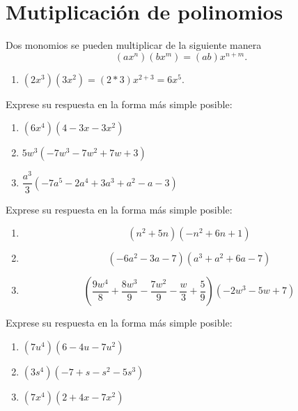 
\section{Mutiplicaci\'on de polinomios}


	Dos monomios se pueden multiplicar de la siguiente manera
	$$
	(ax^{n})(bx^{m})=(ab)x^{n+m}.
	$$



	\begin{problema}
		\begin{enumerate}
			\item $\left( 2x^{3} \right)\left( 3x^{2} \right)=\left( 2*3 \right)x^{2+3}=6x^{5}.$
		\end{enumerate}
		
	\end{problema}
	



	\begin{problema}
		Exprese su respuesta en la forma más simple posible:
		\begin{enumerate}
			\item $(6x^{4})(4-3x-3x^{2})$
			\item $5w^{3}\left( -7w^{3}-7w^{2}+7w+3 \right)$
			\item $\dfrac{a^{3}}{3}\left( -7a^{5}-2a^{4}+3a^{3}+a^{2}-a-3 \right)$
		\end{enumerate}
		
	\end{problema}
	



	\begin{problema}
		Exprese su respuesta en la forma más simple posible:
		\begin{enumerate}
			\item $$
			\left( n^{2}+5n \right)
			\left( -n^{2}+6n+1 \right)
			$$
			
			\item $$
			\left( -6a^{2}-3a-7 \right)
			\left( a^{3}+a^{2}+6a-7 \right)
			$$
			
			\item $$
			\left( \dfrac{9w^{4}}{8}+\dfrac{8w^{3}}{9}-\dfrac{7w^{2}}{9}-\dfrac{w}{3}+\dfrac{5}{9} \right)
			\left( -2w^{3}-5w+7 \right)
			$$
		\end{enumerate}
		
	\end{problema}
	



	\begin{problema}
		Exprese su respuesta en la forma más simple posible:
		\begin{enumerate}
			\item $(7u^4)\left( 6-4u-7u^{2} \right)$ 
			\item $(3s^{4})\left( -7+s-s^{2}-5s^{3} \right)$
			\item $(7x^{4})\left( 2+4x-7x^{2} \right)$
		\end{enumerate}
	\end{problema}



